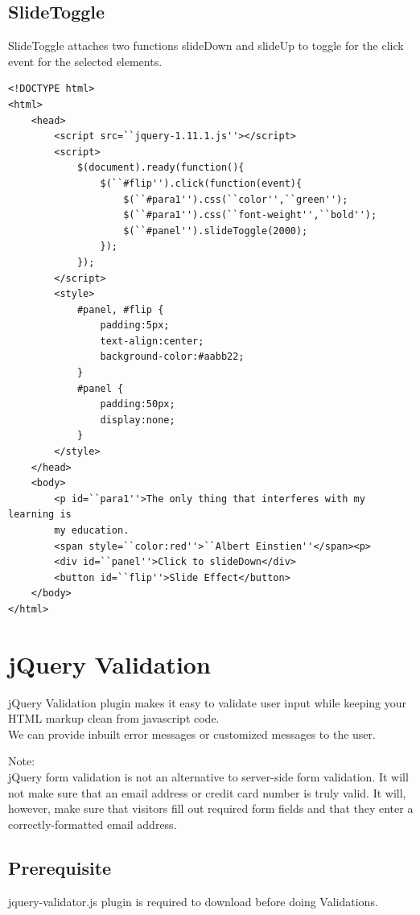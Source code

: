 \documentclass[11pt,a4paper]{article}
\begin{document}
\subsection*{SlideToggle}
SlideToggle attaches two functions slideDown and slideUp to toggle for the click event for the selected elements.
\begin{lstlisting}
<!DOCTYPE html>
<html>
    <head>
        <script src=``jquery-1.11.1.js''></script>
        <script>
            $(document).ready(function(){
                $(``#flip'').click(function(event){
                    $(``#para1'').css(``color'',``green'');
                    $(``#para1'').css(``font-weight'',``bold'');
                    $(``#panel'').slideToggle(2000);
                });
            });
        </script>
        <style>
            #panel, #flip {
                padding:5px;
                text-align:center;
                background-color:#aabb22;
            }
            #panel {
                padding:50px;
                display:none;
            }
        </style>
    </head>
    <body>
        <p id=``para1''>The only thing that interferes with my learning is
        my education.
        <span style=``color:red''>``Albert Einstien''</span><p>
        <div id=``panel''>Click to slideDown</div>
        <button id=``flip''>Slide Effect</button>
    </body>
</html> 
\end{lstlisting}

\section*{jQuery Validation}
jQuery Validation plugin makes it easy to validate user input while keeping your HTML markup clean from javascript code.\\
We can provide inbuilt error messages or customized messages to the user.\newline

Note:\\ 
jQuery form validation is not an alternative to server-side form validation.\newline
It will not make sure that an email address or credit card number is truly valid.\newline
It will, however, make sure that visitors fill out required form fields
and that they enter a correctly-formatted email address.
\subsection*{Prerequisite}
jquery-validator.js plugin is required to download before doing Validations.
\end{document}
